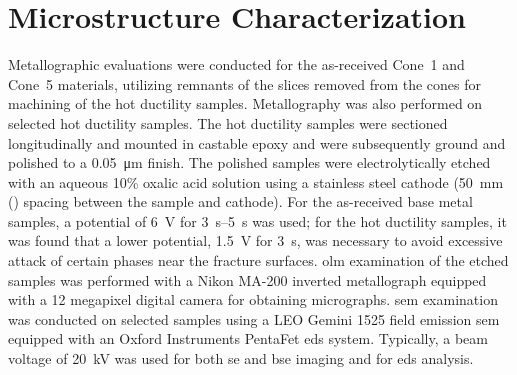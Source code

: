 \section{Microstructure Characterization}
Metallographic evaluations were conducted for the as-received Cone~1 and Cone~5 materials, utilizing remnants of the slices removed from the cones for machining of the hot ductility samples.  Metallography was also performed on selected hot ductility samples.  The hot ductility samples were sectioned longitudinally and mounted in castable epoxy and were subsequently ground and polished to a \SI[round-mode=places,round-precision=2]{0.05}{\micro\meter} finish.  The polished samples were electrolytically etched with an aqueous 10\% oxalic acid solution using a stainless steel cathode (\SI{50}{\milli\meter} () spacing between the sample and cathode). For the as-received base metal samples, a potential of \SI{6}{\volt} for \SIrange[range-phrase=--]{3}{5}{\second} was used; for the hot ductility samples, it was found that a lower potential, \SI[round-mode=places,round-precision=1]{1.5}{\volt} for \SI{3}{\second}, was necessary to avoid excessive attack of certain phases near the fracture surfaces. \Gls{olm} examination of the etched samples was performed with a Nikon MA-200 inverted metallograph equipped with a 12 megapixel digital camera for obtaining micrographs. \Gls{sem} examination was conducted on selected samples using a LEO Gemini 1525 field emission \gls{sem} equipped with an Oxford Instruments PentaFet \gls{eds} system. Typically, a beam voltage of \SI{20}{\kilo\volt} was used for both \gls{se} and \gls{bse} imaging and for \gls{eds} analysis.